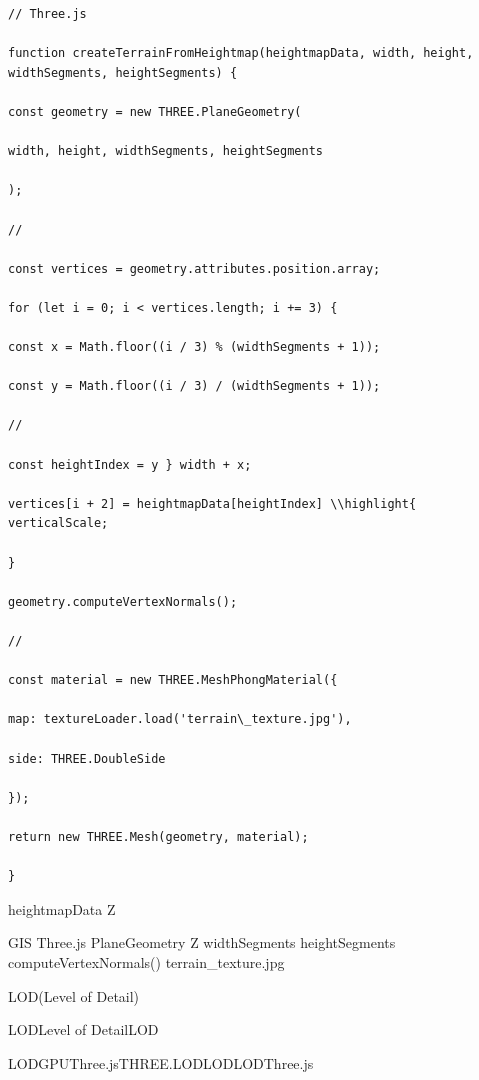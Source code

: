 \begin{lstlisting}[style=javascript]
// Three.js

function createTerrainFromHeightmap(heightmapData, width, height, widthSegments, heightSegments) {

const geometry = new THREE.PlaneGeometry(

width, height, widthSegments, heightSegments

);

// 

const vertices = geometry.attributes.position.array;

for (let i = 0; i < vertices.length; i += 3) {

const x = Math.floor((i / 3) % (widthSegments + 1));

const y = Math.floor((i / 3) / (widthSegments + 1));

// 

const heightIndex = y } width + x;

vertices[i + 2] = heightmapData[heightIndex] \\highlight{ verticalScale;

}

geometry.computeVertexNormals();

// 

const material = new THREE.MeshPhongMaterial({

map: textureLoader.load('terrain\_texture.jpg'),

side: THREE.DoubleSide

});

return new THREE.Mesh(geometry, material);

}
\end{lstlisting}

heightmapData Z

GIS Three.js PlaneGeometry Z widthSegments heightSegments
computeVertexNormals() terrain\_texture.jpg

LOD(Level of Detail)

LODLevel of DetailLOD

LODGPUThree.jsTHREE.LODLODLODThree.js

